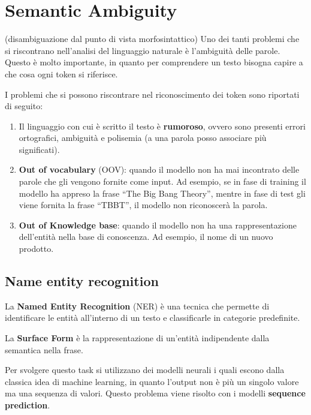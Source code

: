 \section{Semantic Ambiguity}
 (disambiguazione dal punto di vista morfosintattico)
Uno dei tanti problemi che si riscontrano nell'analisi del linguaggio naturale
è l'ambiguità delle parole. Questo è molto importante, in quanto per comprendere
un testo bisogna capire a che cosa ogni token si riferisce.

I problemi che si possono riscontrare nel riconoscimento dei token sono riportati
di seguito:
\begin{enumerate}
      \item Il linguaggio con cui è scritto il testo è \textbf{rumoroso}, ovvero
            sono presenti errori ortografici, ambiguità e polisemia (a una parola
            posso associare più significati).
      \item \textbf{Out of vocabulary} (OOV): quando il modello non ha mai
            incontrato delle parole che gli vengono fornite come input. Ad esempio,
            se in fase di training il modello ha appreso la frase ``The Big Bang
            Theory'', mentre in fase di test gli viene fornita la frase ``TBBT'',
            il modello non riconoscerà la parola.
      \item \textbf{Out of Knowledge base}: quando il modello non ha una
            rappresentazione dell'entità nella base di conoscenza. Ad esempio,
            il nome di un nuovo prodotto.
\end{enumerate}
\subsection{Name entity recognition}
\begin{definizione}
      La \textbf{Named Entity Recognition} (NER) è una tecnica che permette di
      identificare le entità all'interno di un testo e classificarle in categorie
      predefinite.
\end{definizione}
\begin{definizione}
      La \textbf{Surface Form} è la rappresentazione di un'entità indipendente
      dalla semantica nella frase.
\end{definizione}
Per svolgere questo task si utilizzano dei modelli neurali i quali escono dalla
classica idea di machine learning, in quanto l'output non è più un singolo valore
ma una sequenza di valori. Questo problema viene risolto con i modelli \textbf{sequence
      prediction}.

